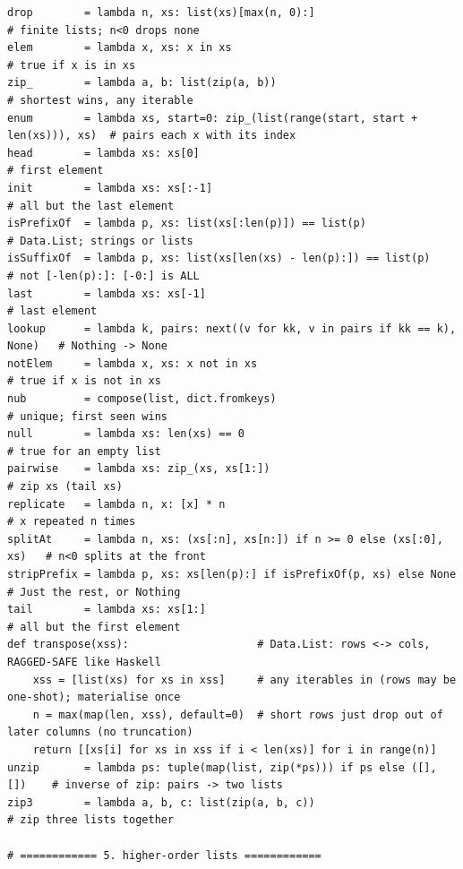 \documentclass[11pt,letterpaper]{book}
\begin{document}
\begin{lstlisting}[style=file]
drop        = lambda n, xs: list(xs)[max(n, 0):]                           # finite lists; n<0 drops none
elem        = lambda x, xs: x in xs                                        # true if x is in xs
zip_        = lambda a, b: list(zip(a, b))                                 # shortest wins, any iterable
enum        = lambda xs, start=0: zip_(list(range(start, start + len(xs))), xs)  # pairs each x with its index
head        = lambda xs: xs[0]                                             # first element
init        = lambda xs: xs[:-1]                                           # all but the last element
isPrefixOf  = lambda p, xs: list(xs[:len(p)]) == list(p)                   # Data.List; strings or lists
isSuffixOf  = lambda p, xs: list(xs[len(xs) - len(p):]) == list(p)         # not [-len(p):]: [-0:] is ALL
last        = lambda xs: xs[-1]                                            # last element
lookup      = lambda k, pairs: next((v for kk, v in pairs if kk == k), None)   # Nothing -> None
notElem     = lambda x, xs: x not in xs                                    # true if x is not in xs
nub         = compose(list, dict.fromkeys)                                 # unique; first seen wins
null        = lambda xs: len(xs) == 0                                      # true for an empty list
pairwise    = lambda xs: zip_(xs, xs[1:])                                  # zip xs (tail xs)
replicate   = lambda n, x: [x] * n                                         # x repeated n times
splitAt     = lambda n, xs: (xs[:n], xs[n:]) if n >= 0 else (xs[:0], xs)   # n<0 splits at the front
stripPrefix = lambda p, xs: xs[len(p):] if isPrefixOf(p, xs) else None     # Just the rest, or Nothing
tail        = lambda xs: xs[1:]                                            # all but the first element
def transpose(xss):                    # Data.List: rows <-> cols, RAGGED-SAFE like Haskell
    xss = [list(xs) for xs in xss]     # any iterables in (rows may be one-shot); materialise once
    n = max(map(len, xss), default=0)  # short rows just drop out of later columns (no truncation)
    return [[xs[i] for xs in xss if i < len(xs)] for i in range(n)]
unzip       = lambda ps: tuple(map(list, zip(*ps))) if ps else ([], [])    # inverse of zip: pairs -> two lists
zip3        = lambda a, b, c: list(zip(a, b, c))                           # zip three lists together

# ============ 5. higher-order lists ============


\end{lstlisting}
\end{document}
